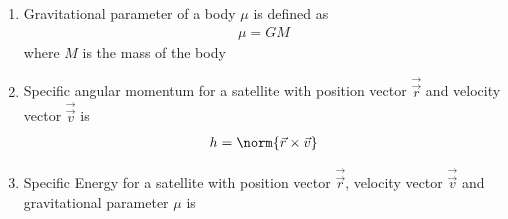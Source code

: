 \begin{enumerate}[label=\thesubsection.\arabic*, ref=\thesubsection.\theenumi]
\begin{align}
\vec{x} = r \vec{r}\brak{\theta}, \quad \text{where } \vec{r}\brak{\theta} = \myvec{\cos\theta \\ \sin\theta}
\end{align}
Substituting into \eqref{eq:EE26BTECH11202-conic_matrix} yields
\begin{align}
r^2 \brak{\vec{r}\brak{\theta}^{\top}\vec{V}\vec{r}\brak{\theta}} + 2r \brak{\vec{u}^{\top}\vec{r}\brak{\theta}} + f = 0
\label{eq:EE26BTECH11202-polar_quad}
\end{align}
Evaluating the inner products:
\begin{align}
\vec{n}^{\top}\vec{r}\brak{\theta} &= \myvec{\cos\theta_0 & \sin\theta_0}\myvec{\cos\theta \\ \sin\theta} = \cos\brak{\theta - \theta_0}
\\
\vec{r}\brak{\theta}^{\top}\vec{V}\vec{r}\brak{\theta} &= \vec{r}\brak{\theta}^{\top}\brak{\vec{I} - e^2\vec{n}\vec{n}^{\top}}\vec{r}\brak{\theta} = 1 - e^2 \cos^2\brak{\theta - \theta_0}
\\
\vec{u}^{\top}\vec{r}\brak{\theta} &= -p e^2 \cos\brak{\theta - \theta_0}
\end{align}
Substituting these into \eqref{eq:EE26BTECH11202-polar_quad}:
\begin{align}
r^2 \sbrak{1 - e^2 \cos^2\brak{\theta - \theta_0}} - 2r p e^2 \cos\brak{\theta - \theta_0} - p^2 e^2 = 0
\end{align}
Factoring the quadratic expression:
\begin{align}
\sbrak{r\brak{1 + e\cos\brak{\theta - \theta_0}} - ep} \sbrak{r\brak{1 - e\cos\brak{\theta - \theta_0}} + ep} = 0
\end{align}
Taking the positive real root for radial distance $r > 0$:
\begin{align}
r\brak{1 + e\cos\brak{\theta - \theta_0}} = ep
\end{align}
yielding \eqref{eq:EE26BTECH11202-polar_conic}
\item Gravitational parameter of a body $\mu$ is defined as
\begin{align}
	\mu=GM
\end{align}
where $M$ is the mass of the body
\item Specific angular momentum for a satellite with position vector $\vec{\vec{r}}$ and velocity vector $\vec{\vec{v}}$ is 
\begin{align}
	h= \norm{\vec{r} \times \vec{v}} \label{eq:EE26BTECH11202-ang-moment}
\end{align}
\item Specific Energy for a satellite with position vector $\vec{\vec{r}}$, velocity vector $\vec{\vec{v}}$ and gravitational parameter $\mu$ is 

\end{enumerate}
